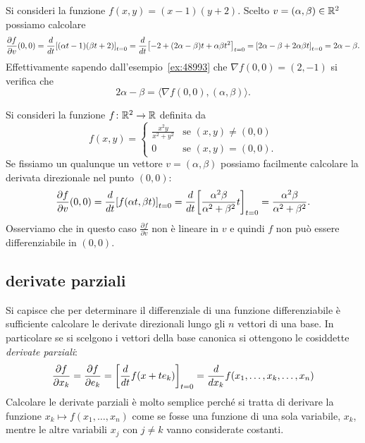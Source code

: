 \begin{example}
Si consideri la funzione $f(x,y) = (x-1)(y+2)$.
Scelto $v=(\alpha,\beta)\in {\mathbb R}^2$ possiamo calcolare
\[
\frac{\partial f}{\partial v}(0,0)
= \frac{d}{dt}{\left[ (\alpha t-1)(\beta t+2) \right]}_{t=0}
= \frac{d}{dt}{\left[ -2 + (2\alpha-\beta)t + \alpha\beta t^2 \right]}_{t=0}
= {\left[ 2\alpha-\beta + 2\alpha\beta t \right]}_{t=0}
= 2\alpha-\beta.
\]
Effettivamente sapendo dall'esempio~\ref{ex:48993}
che $\nabla f(0,0) = (2,-1)$ si verifica che 
\[
  2\alpha - \beta = \langle \nabla f(0,0),(\alpha,\beta)\rangle. 
\]
\end{example}

\begin{example}
Si consideri la funzione $f\colon {\mathbb R}^2\to{\mathbb R}$ definita da 
\[
  f(x,y) = \begin{cases}
    \frac{x^2 y}{x^2+y^2} &\text{se } (x,y)\neq (0,0)\\
    0 &\text{se } (x,y)=(0,0).
  \end{cases}
\]
Se fissiamo un qualunque un vettore $v=(\alpha,\beta)$ possiamo facilmente 
calcolare la derivata direzionale nel punto $(0,0)$:
\[
  \frac{\partial f}{\partial v}(0,0) 
  = \frac{d}{dt}{\left[ f(\alpha t,\beta t) \right]}_{t=0}
  = \frac{d}{dt}{\left[ \frac{\alpha^2\beta}{\alpha^2+\beta^2} t \right]}_{t=0}
  = \frac{\alpha^2 \beta}{\alpha^2+\beta^2}.
\]
Osserviamo che in questo caso $\frac{\partial f}{\partial v}$ non 
è lineare in $v$ e quindi $f$ non può essere differenziabile in $(0,0)$.
\end{example}


\subsection{derivate parziali}

Si capisce che per determinare il differenziale di una funzione 
differenziabile è sufficiente 
calcolare le derivate direzionali lungo gli $n$ vettori di una base.
In particolare se si scelgono i vettori della base canonica si ottengono
le cosiddette \emph{derivate parziali}:
\[
   \frac{\partial  f}{\partial x_k} 
   = \frac{\partial  f}{\partial  e_k}
   = {\left[ \frac{d}{dt}  f( x + t e_k) \right]}_{t=0}
   = \frac{d}{dx_k} f(x_1, \dots, x_k, \dots, x_n)
\]
Calcolare le derivate parziali è molto semplice perché 
si tratta di derivare la funzione $x_k \mapsto f(x_1,\dots,x_n)$
come se fosse una funzione di una sola variabile, $x_k$, mentre 
le altre variabili $x_j$ con $j\neq k$ vanno considerate costanti.

